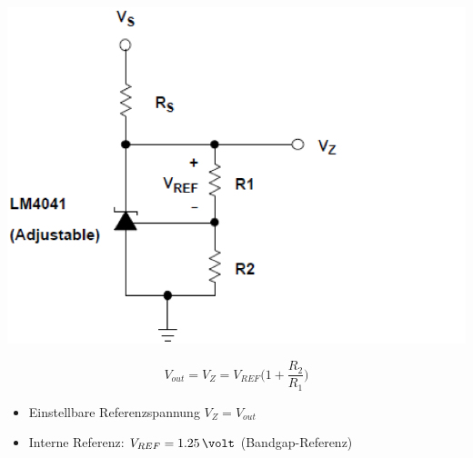 
\begin{minipage}[c]{0.25\columnwidth}
    \includegraphics[width=\columnwidth]{images/beispiel_bandgap.png}
\end{minipage}
\hfill
\begin{minipage}[c]{0.72\columnwidth}
    $$ \boxed{ V_{out} = V_Z = V_{REF} \Big( 1 + \frac{R_2}{R_1} \Big) } $$
    \begin{itemize}
        \item Einstellbare Referenzspannung $V_Z = V_{out}$
        \item Interne Referenz: $V_{REF} = 1.25 \, \volt$ (Bandgap-Referenz)
    \end{itemize}
\end{minipage}

